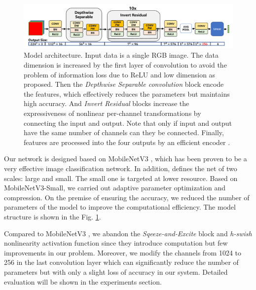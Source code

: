 \documentclass[journal]{IEEEtran}
\begin{document}
\begin{figure}[htbp]
    \centerline{\includegraphics[width=1\textwidth]{fig/net.pdf}}
    \caption{Model architecture. Input data is a single RGB image. The data dimension is increased by the first layer of convolution to avoid the problem of information loss due to ReLU and low dimension as \cite{mobilenetv2} proposed. Then the \textit{Depthwise Separable convolution} \cite{howard2017mobilenets} block encode the features, which effectively reduces the parameters but maintains high accuracy. And \textit{Invert Residual} \cite{mobilenetv2} blocks increase the expressiveness of nonlinear per-channel transformations by connecting the input and output. Note that only if input and output have the same number of channels can they be connected. Finally, features are processed into the four outputs by an efficient encoder \cite{mobilenetv3}. }
    \label{fig:net}
\end{figure}
 

Our network is designed based on MobileNetV3 \cite{mobilenetv3}, which has been proven to be a very effective image classification network. 
In addition, \cite{mobilenetv3} defines the net of two scales: large and small. The small one is targeted at lower resource. Based on MobileNetV3-Small, we carried out adaptive parameter optimization and compression. On the premise of ensuring the accuracy, we reduced the number of parameters of the model to improve the computational efficiency. The model structure is shown in the Fig. \ref{fig:net}.

Compared to MobileNetV3 \cite{mobilenetv3}, we abandon the \textit{Sqeeze-and-Excite} \cite{hu2018squeeze} block and \textit{h-swish} nonlinearity activation function since they introduce computation but few improvements in our problem.  
Moreover, we modify the channels from 1024 to 256 in the last convolution layer which can significantly reduce the number of parameters but with only a slight loss of accuracy in our system. Detailed evaluation will be shown in the experiments section.
\end{document}
